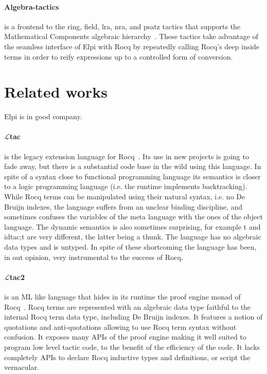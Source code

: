 \documentclass[sigplan,natbib=false]{acmart}
\begin{document}
\paragraph{Algebra-tactics} is a frontend to the ring, field, lra, nra, and psatz
tactics that supports the Mathematical Components algebraic
hierarchy~\cite{sakaguchi:LIPIcs.ITP.2022.29}.
These tactics take advantage of the seamless interface of Elpi with Rocq
by repeatedly calling Rocq's deep inside terms in order to reify expressions
up to a controlled form of conversion.

\section{Related works}

Elpi is in good company.

\paragraph{$\mathcal{L}$tac} is the legacy extension language for Rocq~\cite{10.5555/1765236.1765246}. Its use
in new projects is going to fade away, but there is a substantial code
base in the wild using this language. In spite of a syntax close to
functional programming language its semantics is closer to a logic programming
language (i.e. the runtime implements backtracking). While Rocq terms
can be manipulated using their natural syntax, i.e. no De Bruijn indexes,
the language suffers from
an unclear binding discipline, and sometimes confuses the variables of the
meta language with the ones of the object language. The dynamic semantics
is also sometimes surprising, for example t and idtac;t are very different,
the latter being a thunk. The language has no algebraic data types and is untyped.
In spite of these shortcoming the language has been,
in out opinion, very instrumental to the success of Rocq.

\paragraph{$\mathcal{L}$tac2} is an ML like language that hides in its
runtime the proof engine monad of Rocq~\cite{10.1145/1090189.1086390}.
Rocq terms are represented with an algebraic data type faithful to the
internal Rocq term data type, including De Bruijn indexes. It features a
notion of quotations and anti-quotations allowing to use Rocq term
syntax without confusion. It exposes many APIs of the proof engine
making it well suited to program low level tactic code, to the benefit of
the efficiency of the code. It lacks completely APIs to declare Rocq inductive
types and definitions, or script the vernacular.
\end{document}
